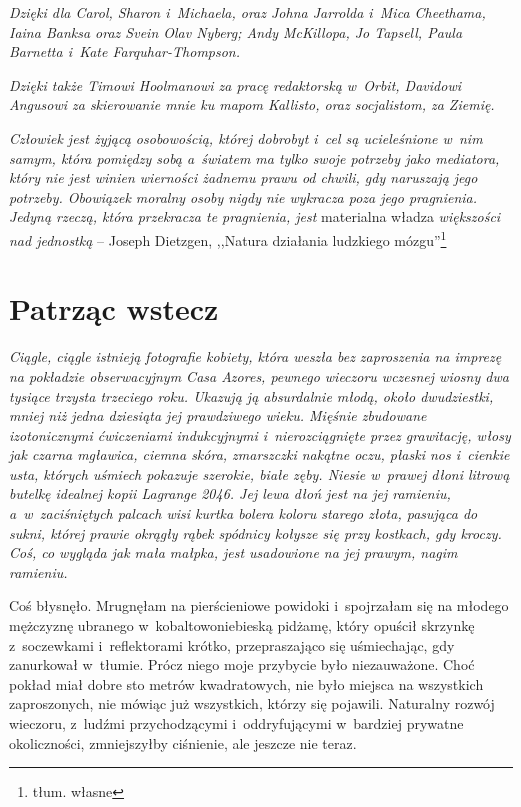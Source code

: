 \documentclass[oneside,polish,11pt,sfheadings]{mwbk}
\begin{document}
\textit{Dzięki dla Carol, Sharon i~Michaela, oraz Johna Jarrolda i~Mica
Cheethama, Iaina Banksa oraz Svein Olav Nyberg; Andy McKillopa, Jo
Tapsell, Paula Barnetta i~Kate Farquhar-Thompson.}

\textit{Dzięki także Timowi Hoolmanowi za pracę redaktorską w~Orbit,
Davidowi Angusowi za skierowanie mnie ku mapom Kallisto, oraz
socjalistom, za Ziemię.}

\newpage


\textit{Człowiek jest żyjącą osobowością, której dobrobyt i~cel są
ucieleśnione w~nim samym, która pomiędzy sobą a~światem ma tylko swoje
potrzeby jako mediatora, który nie jest winien wierności żadnemu prawu
od chwili, gdy naruszają jego potrzeby. Obowiązek moralny osoby nigdy
nie wykracza poza jego pragnienia. Jedyną rzeczą, która przekracza te
pragnienia, jest }materialna władza \textit{większości nad jednostką} -- Joseph Dietzgen, ,,Natura działania ludzkiego mózgu''\footnote{tłum.
własne}


\chapter{Patrząc wstecz}

\textit{Ciągle, ciągle istnieją fotografie kobiety, która weszła bez
zaproszenia na imprezę na pokładzie obserwacyjnym Casa Azores, pewnego
wieczoru wczesnej wiosny dwa tysiące trzysta trzeciego roku. Ukazują ją
absurdalnie młodą, około dwudziestki, mniej niż jedna dziesiąta jej
prawdziwego wieku. Mięśnie zbudowane izotonicznymi ćwiczeniami
indukcyjnymi i~nierozciągnięte przez grawitację, włosy jak czarna
mgławica, ciemna skóra, zmarszczki nakątne oczu, płaski nos i~cienkie
usta, których uśmiech pokazuje szerokie, białe zęby. Niesie w~prawej
dłoni litrową butelkę idealnej kopii Lagrange 2046. Jej lewa dłoń jest
na jej ramieniu, a~w~zaciśniętych palcach wisi kurtka bolera koloru
starego złota, pasująca do sukni, której prawie okrągły rąbek spódnicy
kołysze się przy kostkach, gdy kroczy. Coś, co wygląda jak mała małpka,
jest usadowione na jej prawym, nagim ramieniu.}

Coś błysnęło. Mrugnęłam na pierścieniowe powidoki i~spojrzałam się na
młodego mężczyznę ubranego w~kobaltowoniebieską pidżamę, który opuścił
skrzynkę z~soczewkami i~reflektorami krótko, przepraszająco się
uśmiechając, gdy zanurkował w~tłumie. Prócz niego moje przybycie było
niezauważone. Choć pokład miał dobre sto metrów kwadratowych, nie było
miejsca na wszystkich zaproszonych, nie mówiąc już wszystkich, którzy
się pojawili. Naturalny rozwój wieczoru, z~ludźmi przychodzącymi i~oddryfującymi w~bardziej prywatne okoliczności, zmniejszyłby ciśnienie,
ale jeszcze nie teraz.
\end{document}
